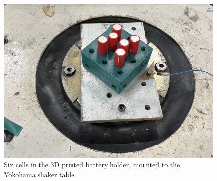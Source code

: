 \documentclass{article}
\begin{document}
\begin{figure}[H]
\centering
\includegraphics[width=\textwidth]{images/vibe-setup}
\caption{Six cells in the 3D printed battery holder, mounted to the Yokohama shaker table.}
\label{fig:cell-setup}
\end{figure}
\end{document}
